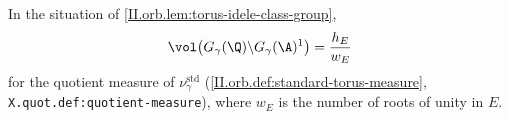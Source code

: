 In the situation of \cref{II.orb.lem:torus-idele-class-group},
\[
  \vol\bigl(G_\gamma(\Q)\backslash G_\gamma(\A)^1\bigr)=\frac{h_E}{w_E}
\]
for the quotient measure of $\nu_\gamma^{\mathrm{std}}$ (\cref{II.orb.def:standard-torus-measure}, \texttt{X.quot.def:quotient-measure}), where $w_E$ is the number of roots of
unity in $E$.
